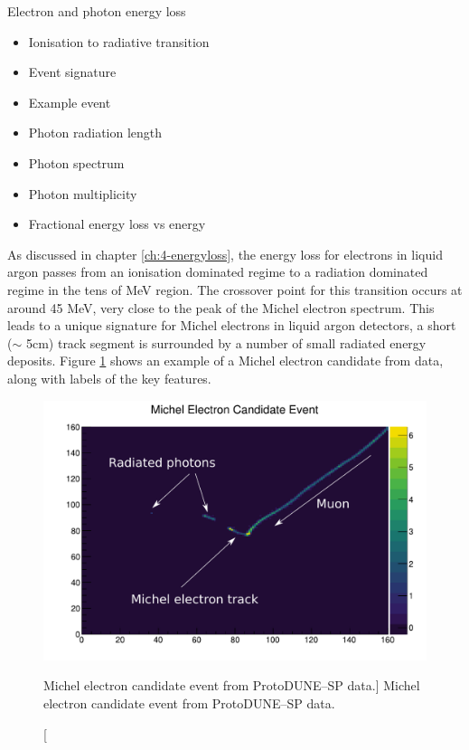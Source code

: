 \begin{mccorrection}
	Electron and photon energy loss 
	\begin{itemize}
	\item Ionisation to radiative transition
	\item Event signature
	\item Example event
	\item Photon radiation length
	\item Photon spectrum
	\item Photon multiplicity
	\item Fractional energy loss vs energy
	\end{itemize}
\end{mccorrection}

As discussed in chapter \ref{ch:4-energyloss}, the energy loss for electrons in
liquid argon passes from an ionisation dominated regime to a radiation dominated
regime in the tens of MeV region. The crossover point for this transition occurs
at around 45 MeV, very close to the peak of the Michel electron spectrum. This
leads to a unique signature for Michel electrons in liquid argon detectors, a
short ($\sim$ 5cm) track segment is surrounded by a number of small radiated 
energy deposits. Figure \ref{fig:michel_event} shows an example of a Michel 
electron candidate from \protodune{} data, along with labels of the key 
features.

\begin{figure}
	\centering
	\includegraphics[width=\textwidth]{figures/michel_candidate.pdf}
	\caption
	[Michel electron candidate event from ProtoDUNE--SP data.]
	{Michel electron candidate event from ProtoDUNE--SP data.}
	\label{fig:michel_event}
\end{figure}

